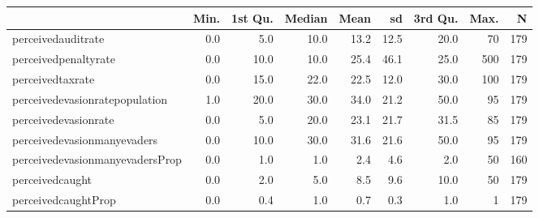 \begin{table}[ht]
\centering
\begin{tabular}{lrrrrrrrr}
  \hline
 & Min. & 1st Qu. & Median & Mean & sd & 3rd Qu. & Max. & N \\ 
  \hline
perceivedauditrate & 0.0 & 5.0 & 10.0 & 13.2 & 12.5 & 20.0 & 70 & 179 \\ 
  perceivedpenaltyrate & 0.0 & 10.0 & 10.0 & 25.4 & 46.1 & 25.0 & 500 & 179 \\ 
  perceivedtaxrate & 0.0 & 15.0 & 22.0 & 22.5 & 12.0 & 30.0 & 100 & 179 \\ 
  perceivedevasionratepopulation & 1.0 & 20.0 & 30.0 & 34.0 & 21.2 & 50.0 & 95 & 179 \\ 
  perceivedevasionrate & 0.0 & 5.0 & 20.0 & 23.1 & 21.7 & 31.5 & 85 & 179 \\ 
  perceivedevasionmanyevaders & 0.0 & 10.0 & 30.0 & 31.6 & 21.6 & 50.0 & 95 & 179 \\ 
  perceivedevasionmanyevadersProp & 0.0 & 1.0 & 1.0 & 2.4 & 4.6 & 2.0 & 50 & 160 \\ 
  perceivedcaught & 0.0 & 2.0 & 5.0 & 8.5 & 9.6 & 10.0 & 50 & 179 \\ 
  perceivedcaughtProp & 0.0 & 0.4 & 1.0 & 0.7 & 0.3 & 1.0 &  1 & 179 \\ 
   \hline
\end{tabular}
\end{table}
